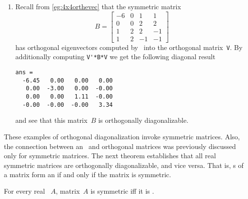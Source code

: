 \begin{example}
\begin{enumerate}[ref=\ref{eg:1orthdiag}(\alph*)]
\item Recall from \cref{eg:4x4orthevec} that the symmetric matrix
\begin{equation*}
B=\begin{bmatrix} -6 & 0 & 1 & 1
\\ 0 & 0 & 2 & 2
\\ 1 & 2 & 2 & -1
\\ 1 & 2 & -1 & -1 \end{bmatrix}
\end{equation*}
has orthogonal eigenvectors computed by \script\ into the orthogonal matrix~\verb|V|.
By additionally computing \verb|V'*B*V| we get the following diagonal result \twodp
\setbox\ajrqrbox\hbox{}%
\marginajrbox%
\begin{verbatim}
ans =
  -6.45   0.00   0.00   0.00
   0.00  -3.00   0.00  -0.00
   0.00   0.00   1.11  -0.00
  -0.00  -0.00  -0.00   3.34
\end{verbatim}
and see that this matrix~\(B\) is orthogonally diagonalizable.
\aqed
\end{enumerate}
\end{example}



These examples of orthogonal diagonalization invoke symmetric matrices.
Also, the connection between an \svd\ and orthogonal matrices was previously discussed only for symmetric matrices. 
The next theorem establishes that all real symmetric matrices are orthogonally diagonalizable, and vice versa.
That is, s of a matrix form an  if and only if the matrix is symmetric.
 

\begin{theorem}[spectral] \label{thm:symspec} 
For every real ~\(A\), 
matrix~\(A\) is symmetric iff it is .
\end{theorem}

